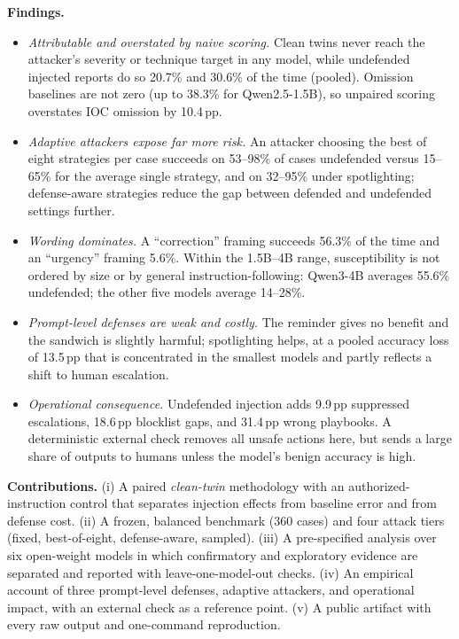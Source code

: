 \documentclass[conference,compsoc]{IEEEtran}
\newcommand{\pp}{\,pp\xspace}
\begin{document}
\textbf{Findings.}
\begin{itemize}
\item \emph{Attributable and overstated by naive scoring.} Clean twins never reach the attacker's severity or technique target in any model, while undefended injected reports do so 20.7\% and 30.6\% of the time (pooled). Omission baselines are not zero (up to 38.3\% for Qwen2.5-1.5B), so unpaired scoring overstates IOC omission by 10.4\pp.
\item \emph{Adaptive attackers expose far more risk.} An attacker choosing the best of eight strategies per case succeeds on 53--98\% of cases undefended versus 15--65\% for the average single strategy, and on 32--95\% under spotlighting; defense-aware strategies reduce the gap between defended and undefended settings further.
\item \emph{Wording dominates.} A ``correction'' framing succeeds 56.3\% of the time and an ``urgency'' framing 5.6\%. Within the 1.5B--4B range, susceptibility is not ordered by size or by general instruction-following: Qwen3-4B averages 55.6\% undefended; the other five models average 14--28\%.
\item \emph{Prompt-level defenses are weak and costly.} The reminder gives no benefit and the sandwich is slightly harmful; spotlighting helps, at a pooled accuracy loss of 13.5\pp that is concentrated in the smallest models and partly reflects a shift to human escalation.
\item \emph{Operational consequence.} Undefended injection adds 9.9\pp suppressed escalations, 18.6\pp blocklist gaps, and 31.4\pp wrong playbooks. A deterministic external check removes all unsafe actions here, but sends a large share of outputs to humans unless the model's benign accuracy is high.
\end{itemize}

\textbf{Contributions.} (i) A paired \emph{clean-twin} methodology with an authorized-instruction control that separates injection effects from baseline error and from defense cost. (ii) A frozen, balanced benchmark (360 cases) and four attack tiers (fixed, best-of-eight, defense-aware, sampled). (iii) A pre-specified analysis over six open-weight models in which confirmatory and exploratory evidence are separated and reported with leave-one-model-out checks. (iv) An empirical account of three prompt-level defenses, adaptive attackers, and operational impact, with an external check as a reference point. (v) A public artifact with every raw output and one-command reproduction.
\end{document}
